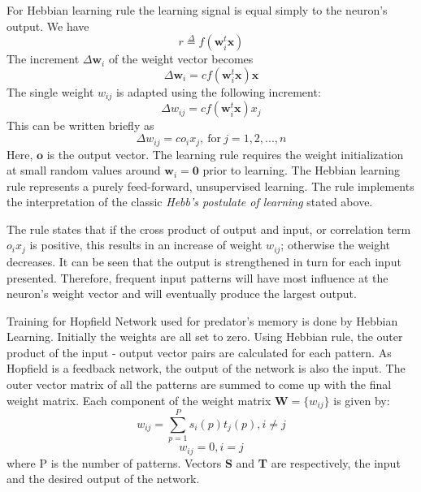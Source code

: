 For Hebbian learning rule the learning signal is equal simply to the neuron's output. We have
\begin{equation}
	r \overset{\Delta}{=} f(\textbf{w}_i^t \textbf{x})
\end{equation}
The increment \(\Delta\textbf{w}_i\) of the weight vector becomes
\begin{equation}
	\Delta\textbf{w}_i = cf(\textbf{w}_i^t \textbf{x})\textbf{x}
\end{equation}
The single weight \( w_{ij} \) is adapted using the following increment:
\begin{equation}
	\Delta\textit{w}_{ij} = cf(\textbf{w}_i^t \textbf{x})x_j
\end{equation}
This can be written briefly as 
\begin{equation}
	\Delta\textit{w}_{ij} = c o_i x_j, \> \text{for} \> j = 1, 2, ..., n
\end{equation}
Here, \(\textbf{o}\) is the output vector. The learning rule requires the weight initialization at small random values around \( \textbf{w}_i = \textbf{0}\) prior to learning. The Hebbian learning rule represents a purely feed-forward, unsupervised learning. The rule implements the interpretation of the classic \textit{Hebb's postulate of learning} stated above. 

The rule states that if the cross product of output and input, or correlation term \(o_ix_j\) is positive, this results in an increase of weight \(w_{ij}\); otherwise the weight decreases. It can be seen that the output is strengthened in turn for each input presented. Therefore, frequent input patterns will have most influence at the neuron's weight vector and will eventually produce the largest output.

Training for Hopfield Network used for predator's memory is done by Hebbian Learning. Initially the weights are all set to zero. Using Hebbian rule, the outer product of the input - output vector pairs are calculated for each pattern. As Hopfield is a feedback network, the output of the network is also the input. The outer vector matrix of all the patterns are summed to come up with the final weight matrix. Each component of the weight matrix \(\textbf{W} = \{w_{ij}\}\) is given by:
\begin{equation}
w_{ij} = \sum_{p=1}^{P} s_i(p) t_j(p), i \neq j
\end{equation}
\[
w_{ij} = 0, i = j
\]
where P is the number of patterns. Vectors \textbf{S} and \textbf{T} are respectively, the input and the desired output of the network.

